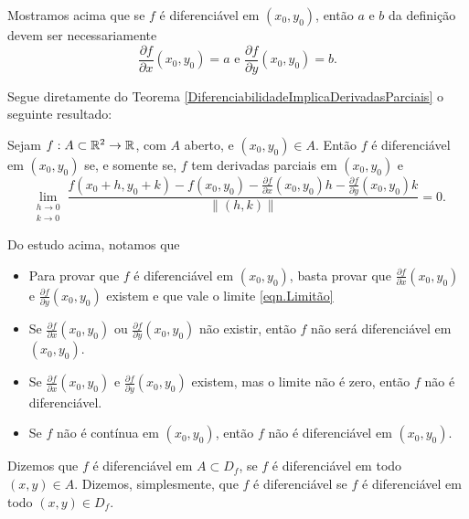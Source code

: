 \begin{remark}
    Mostramos acima que se \(f\) é diferenciável em \((x_0,y_0)\), então \(a\) e \(b\) da definição devem ser necessariamente \[\frac{\partial f}{\partial x}(x_0,y_0) = a \text{ e } \frac{\partial f}{\partial y}(x_0,y_0)  = b.\]
\end{remark}

Segue diretamente do Teorema \ref{DiferenciabilidadeImplicaDerivadasParciais} o seguinte resultado:

\begin{corollary}
    Sejam \(f:A\subset\mathbb{R}^2 \to \mathbb{R}\), com \(A\) aberto, e \((x_0,y_0)\in A\). Então \(f\) é diferenciável em \((x_0,y_0)\) se, e somente se, \(f\) tem derivadas parciais em \((x_0,y_0)\) e
        {\small \begin{equation}\label{eqn.Limitão}
            \lim_{\substack{h\to 0 \\ k\to 0}} \frac{f(x_0+h,y_0+k) - f(x_0,y_0) - \frac{\partial f}{\partial x}(x_0,y_0)h - \frac{\partial f}{\partial y}(x_0,y_0)k}{\|(h,k)\|} = 0.
        \end{equation}}
\end{corollary}

\begin{remark}
    Do estudo acima, notamos que
        \begin{itemize}
            \item Para provar que \(f\) é diferenciável em \((x_0,y_0)\), basta provar que \(\frac{\partial f}{\partial x}(x_0,y_0)\) e \(\frac{\partial f}{\partial y}(x_0,y_0)\) existem e que vale o limite \eqref{eqn.Limitão}
            \item Se \(\frac{\partial f}{\partial x}(x_0,y_0)\) ou \(\frac{\partial f}{\partial y}(x_0,y_0)\) não existir, então \(f\) não será diferenciável em \((x_0,y_0)\).
            \item Se \(\frac{\partial f}{\partial x}(x_0,y_0)\) e \(\frac{\partial f}{\partial y}(x_0,y_0)\) existem, mas o limite não é zero, então \(f\) não é diferenciável.
            \item Se \(f\) não é contínua em \((x_0,y_0)\), então \(f\) não é diferenciável em \((x_0,y_0)\).
        \end{itemize}
\end{remark}

\begin{definition}
    Dizemos que \(f\) é diferenciável em \(A\subset D_f\), se \(f\) é diferenciável em todo \((x,y)\in A\). Dizemos, simplesmente, que \(f\) é diferenciável se \(f\) é diferenciável em todo \((x,y)\in D_f\).
\end{definition}

